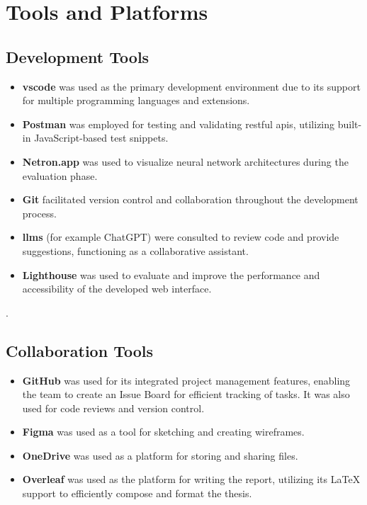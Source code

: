 \section{Tools and Platforms}
\label{sec:tools-and-platforms}

\subsection*{Development Tools}
\label{subsec:development-tools}

\begin{itemize}
    \item \textbf{\acrlong{vscode}} was used as the primary development environment due to its support for multiple programming languages and extensions.
\item \textbf{Postman} was employed for testing and validating \acrshort{rest}ful \glspl{api}, utilizing built-in JavaScript-based test snippets.
\item \textbf{Netron.app} was used to visualize neural network architectures during the evaluation phase.
\item \textbf{Git} facilitated version control and collaboration throughout the development process.
\item \textbf{\glspl{llm}} (for example ChatGPT) were consulted to review code and provide suggestions, functioning as a collaborative assistant.
\item \textbf{Lighthouse} was used to evaluate and improve the performance and accessibility of the developed web interface.
\end{itemize}.

\subsection*{Collaboration Tools}
\label{subsec:collaboration-and-design-tools}

\begin{itemize}
    \item \textbf{GitHub} was used for its integrated project management features, enabling the team to create an Issue Board for efficient tracking of tasks. It was also used for code reviews and version control.

    \item \textbf{Figma} was used as a tool for sketching and creating wireframes.
    
    \item \textbf{OneDrive} was used as a platform for storing and sharing files.
    
    \item \textbf{Overleaf} was used as the platform for writing the report, utilizing its LaTeX support to efficiently compose and format the thesis.
\end{itemize}

